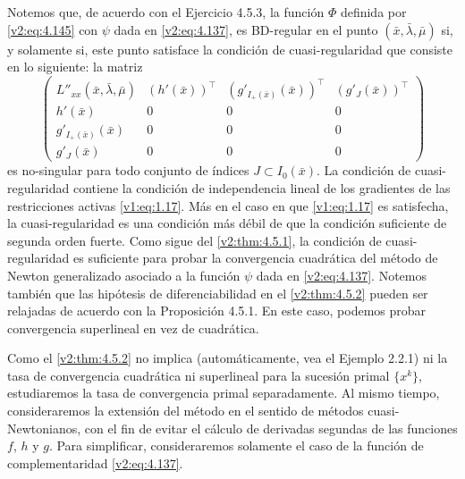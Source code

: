 Notemos que, de acuerdo con el Ejercicio 4.5.3, la función $\Phi$ definida por \eqref{v2:eq:4.145} con $\psi$ dada en \eqref{v2:eq:4.137}, es BD-regular en el punto $(\bar{x}, \bar{\lambda}, \bar{\mu})$ si, y solamente si, este punto satisface la condición de cuasi-regularidad que consiste en lo siguiente: la matriz
\[
    \begin{pmatrix} L''_{xx}(\bar{x}, \bar{\lambda}, \bar{\mu}) & (h'(\bar{x}))^\top & (g'_{I_+(\bar{x})}(\bar{x}))^\top & (g'_{J}(\bar{x}))^\top \\
    h'(\bar{x}) & 0 & 0 & 0 \\
    g'_{I_+(\bar{x})}(\bar{x}) & 0 & 0 & 0 \\
    g'_J(\bar{x}) & 0 & 0 & 0 \end{pmatrix}
\]
es no-singular para todo conjunto de índices $J \subset I_0(\bar{x})$. La condición de cuasi-regularidad contiene la condición de independencia lineal de los gradientes de las restricciones activas \eqref{v1:eq:1.17}. Más en el caso en que \eqref{v1:eq:1.17} es satisfecha, la cuasi-regularidad es una condición más débil de que la condición suficiente de segunda orden fuerte. Como sigue del \cref{v2:thm:4.5.1}, la condición de cuasi-regularidad es suficiente para probar la convergencia cuadrática del método de Newton generalizado asociado a la función $\psi$ dada en \eqref{v2:eq:4.137}.
Notemos también que las hipótesis de diferenciabilidad en el \cref{v2:thm:4.5.2} pueden ser relajadas de acuerdo con la Proposición 4.5.1. En este caso, podemos probar convergencia superlineal en vez de cuadrática.

Como el \cref{v2:thm:4.5.2} no implica (automáticamente, vea el Ejemplo 2.2.1) ni la tasa de convergencia cuadrática ni superlineal para la sucesión primal $\{x^k\}$, estudiaremos la tasa de convergencia primal separadamente. Al mismo tiempo, consideraremos la extensión del método en el sentido de métodos cuasi-Newtonianos, con el fin de evitar el cálculo de derivadas segundas de las funciones $f$, $h$ y $g$. Para simplificar, consideraremos solamente el caso de la función de complementaridad \eqref{v2:eq:4.137}.

